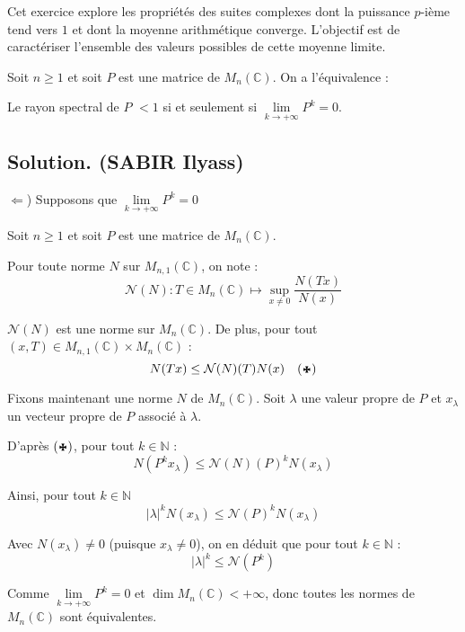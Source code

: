 Cet exercice explore les propri{\'e}t{\'e}s des suites complexes dont la puissance $p$-i{\`e}me tend vers $1$ et dont la moyenne arithm{\'e}tique converge. L'objectif est de caract{\'e}riser l'ensemble des valeurs possibles de cette moyenne limite.
\begin{exercise}[]
Soit $n \geqslant 1$ et soit $P$ est une matrice de $M_n (\mathbb{C})$. On a l'{\'e}quivalence :

\begin{center}
  Le rayon spectral de $P$ $< 1$ si et seulement si $\underset{k \to + \infty}{\lim} P^k = 0$.
\end{center}

\end{exercise}

\subsection*{Solution. (SABIR Ilyass)}


$\Leftarrow$) Supposons que $\underset{k \to + \infty}{\lim} P^k = 0$

Soit $n \geqslant 1$ et soit $P$ est une matrice de $M_n (\mathbb{C})$.

Pour toute norme $N$ sur $M_{n, 1} (\mathbb{C})$, on note :
\[ \mathcal{N}(N) : T \in M_n (\mathbb{C}) \longmapsto \underset{x \neq
   0}{\sup}  \frac{N (Tx)}{N (x)} \]


$\mathcal{N}(N)$ est une norme sur $M_n (\mathbb{C})$. De plus, pour tout $(x,
T) \in M_{n, 1} (\mathbb{C}) \times M_n (\mathbb{C})$ :
\[ N (Tx) \leq \mathcal{N}(N) (T) N (x) \quad (\kreuz) \]


Fixons maintenant une norme $N$ de $M_n (\mathbb{C})$. Soit $\lambda$ une
valeur propre de $P$ et $x_{\lambda}$ un vecteur propre de $P$ associ{\'e}
{\`a} $\lambda$.

D'apr{\`e}s $(\kreuz)$, pour tout $k \in \mathbb{N}$ :
\[ N (P^k x_{\lambda}) \leq \mathcal{N} (N) (P)^k N (x_{\lambda}) \]


Ainsi, pour tout $k \in \mathbb{N}$
\[ | \lambda |^k N (x_{\lambda}) \leq \mathcal{N}(P)^k N (x_{\lambda}) \]


Avec $N (x_{\lambda}) \neq 0$ (puisque $x_{\lambda} \neq 0$), on en d{\'e}duit
que pour tout $k \in \mathbb{N}$ :
\[ | \lambda |^k \leq \mathcal{N}(P^k) \]


Comme $\underset{k \rightarrow + \infty}{\lim} P^k = 0$ et $\dim M_n
(\mathbb{C}) < + \infty$, donc toutes les normes de $M_n (\mathbb{C})$ sont
{\'e}quivalentes.

